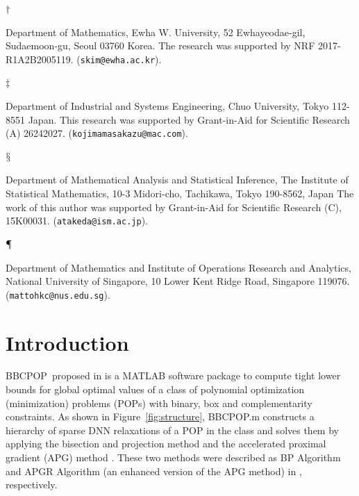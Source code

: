 \documentclass[12pt]{article}
\def\matBP{BBCPOP}
\begin{document}
\medskip

\noindent
\parbox[t]{0.5cm}{$\dagger$}
\parbox[t]{14.9cm}{Department of Mathematics, Ewha W. University,
52 Ewhayeodae-gil, Sudaemoon-gu, Seoul 03760 Korea. 
 The research was supported
by NRF 2017-R1A2B2005119. 
({\tt skim@ewha.ac.kr}).
}

\medskip

\noindent
\parbox[t]{0.5cm}{$\ddagger$}
\parbox[t]{14.9cm}{Department of Industrial and Systems Engineering,
Chuo University, Tokyo 112-8551 Japan.
This research was supported by Grant-in-Aid for Scientific Research (A) 26242027.
({\tt kojimamasakazu@mac.com}).
}


\medskip

\noindent
\parbox[t]{0.5cm}{$\mathsection$}
\parbox[t]{14.9cm}{ Department of Mathematical Analysis and Statistical Inference, 
The Institute of Statistical Mathematics, 
10-3 Midori-cho, Tachikawa, Tokyo 190-8562, Japan
           The work of this author was supported by Grant-in-Aid for Scientific Research (C), 15K00031.
    ({\tt atakeda{@}ism.ac.jp}).
}

\medskip

\noindent
\parbox[t]{0.5cm}{$\mathparagraph$}
\parbox[t]{14.9cm}{Department of Mathematics and Institute of Operations Research and Analytics, 
	National University of
         Singapore, 10 Lower Kent Ridge Road, Singapore 119076.  
 ({\tt mattohkc@nus.edu.sg}).
}

\newpage



%
\section{Introduction}

\matBP\ proposed in \cite{ITO2018} is a MATLAB software package to compute tight lower bounds for 
global optimal values of a class of polynomial optimization (minimization) problems (POPs) 
with binary, box and complementarity constraints. 
As shown in Figure~\ref{fig:structure}, \matBP.m constructs a hierarchy of sparse DNN relaxations of a POP in the class 
and solves them by applying the bisection and projection method 
\cite{KIM2013,ARIMA2017,KIM2016} and the accelerated proximal gradient (APG) method \cite{BECK2009}. 
These two methods were described as BP Algorithm and APGR Algorithm (an enhanced version of the APG method) in \cite{ITO2018}, respectively. 
\end{document}
